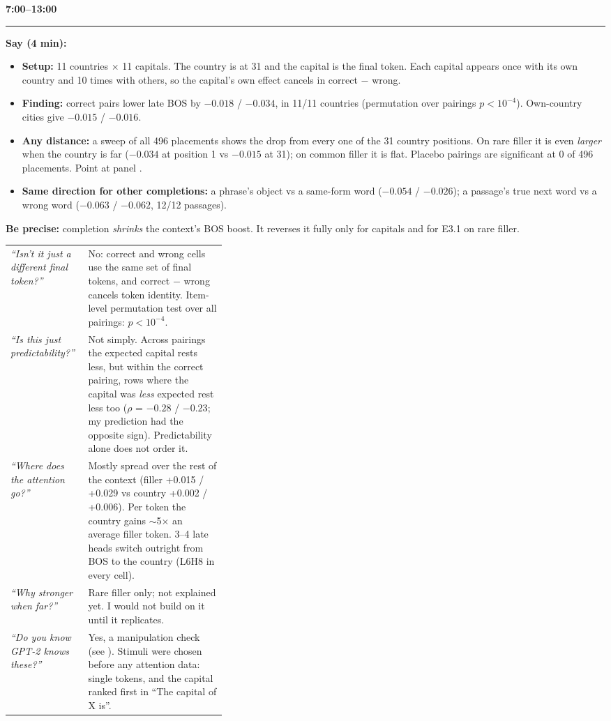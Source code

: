 \documentclass[10pt]{article}
\makeatletter
\newcommand{\stage}[2]{\par\vspace{6pt}{\large\bfseries\color{cblue}#1}\hfill{\large\bfseries #2}\\[-4pt]\rule{\linewidth}{0.6pt}\par}
\newcommand{\lab}[1]{\textbf{\color{ink2}#1}}
\newcommand{\qa}[1]{\par\begin{tabularx}{\linewidth}{@{}>{\raggedright\arraybackslash\itshape}p{0.36\linewidth}X@{}}\toprule #1 \bottomrule\end{tabularx}\par}
\makeatother
\begin{document}
\stage{Result \ding{173}: completion releases it}{7:00--13:00}
\lab{Say (4 min):}
\begin{itemize}
\item \textbf{Setup:} 11 countries $\times$ 11 capitals. The country is at 31 and the capital is the final token. Each capital appears once with its own country and 10 times with others, so the capital's own effect cancels in correct $-$ wrong.
\item \textbf{Finding:} correct pairs lower late BOS by $-0.018$ / $-0.034$, in 11/11 countries (permutation over pairings $p < 10^{-4}$). Own-country cities give $-0.015$ / $-0.016$.
\item \textbf{Any distance:} a sweep of all 496 placements shows the drop from every one of the 31 country positions. On rare filler it is even \emph{larger} when the country is far ($-0.034$ at position 1 vs $-0.015$ at 31); on common filler it is flat. Placebo pairings are significant at 0 of 496 placements. Point at panel .
\item \textbf{Same direction for other completions:} a phrase's object vs a same-form word ($-0.054$ / $-0.026$); a passage's true next word vs a wrong word ($-0.063$ / $-0.062$, 12/12 passages).
\end{itemize}
\lab{Be precise:} completion \emph{shrinks} the context's BOS boost. It reverses it fully only for capitals and for E3.1 on rare filler.
\qa{
``Isn't it just a different final token?'' & No: correct and wrong cells use the same set of final tokens, and correct $-$ wrong cancels token identity. Item-level permutation test over all pairings: $p < 10^{-4}$. \\
``Is this just predictability?'' & Not simply. Across pairings the expected capital rests less, but within the correct pairing, rows where the capital was \emph{less} expected rest less too ($\rho$ = $-0.28$ / $-0.23$; my prediction had the opposite sign). Predictability alone does not order it. \\
``Where does the attention go?'' & Mostly spread over the rest of the context (filler +0.015 / +0.029 vs country +0.002 / +0.006). Per token the country gains $\sim$5$\times$ an average filler token. 3--4 late heads switch outright from BOS to the country (L6H8 in every cell). \\
``Why stronger when far?'' & Rare filler only; not explained yet. I would not build on it until it replicates. \\
``Do you know GPT-2 knows these?'' & Yes, a manipulation check (see \ding{174}). Stimuli were chosen before any attention data: single tokens, and the capital ranked first in ``The capital of X is''. \\
}
\end{document}

